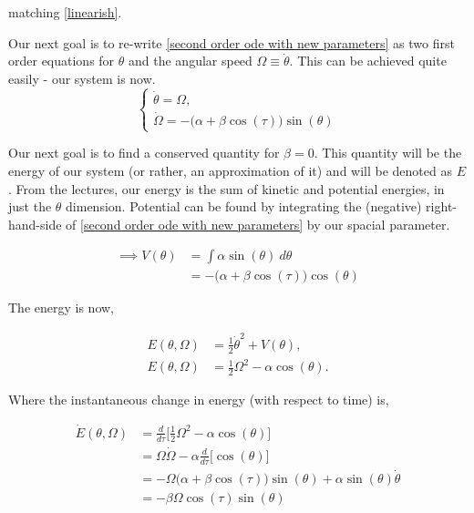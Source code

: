 \documentclass[12pt]{article}
\begin{document}
\begin{enumerate}[]
\begin{solution}
        matching \ref{linearish}. 

        Our next goal is to re-write \ref{second order ode with new parameters} as two first order equations for $\theta$ and the angular speed $\Omega \equiv \dot{\theta}$. This can be achieved quite easily - our system is now. 
        \begin{equation}
        \begin{cases}
            \dot{\theta} = \Omega, \\
            \dot{\Omega} = -\big(\alpha + \beta \cos(\tau)\big)\sin(\theta) \label{Nonlinear system}
        \end{cases}    
        \end{equation}

        Our next goal is to find a conserved quantity for $\beta = 0$. This quantity will be the energy of our system (or rather, an approximation of it) and will be denoted as $E$. From the lectures, our energy is the sum of kinetic and potential energies, in just the $\theta$ dimension. Potential can be found by integrating the (negative) right-hand-side of \ref{second order ode with new parameters} by our spacial parameter. 

        \begin{align}
            \implies V(\theta) &= \int \alpha\sin(\theta) \ d\theta \nonumber\\
            &= -\big(\alpha + \beta\cos(\tau))\cos(\theta)
        \end{align}

        The energy is now,

        \begin{align}
            E(\theta, \Omega) &= \frac{1}{2} \dot{\theta}^2 + V(\theta),    \nonumber   \\
            E(\theta, \Omega) &= \frac{1}{2} \Omega^2 -\alpha\cos(\theta).
        \end{align}

        Where the instantaneous change in energy (with respect to time) is,

        \begin{align}
            \dot{E}(\theta, \Omega) &=  \frac{d}{d\tau}\bigg[ \frac{1}{2}\Omega^2 - \alpha\cos(\theta) \bigg]  \nonumber\\
            &= \Omega\dot{\Omega} - \alpha\frac{d}{d\tau}\bigg[ \cos(\theta) \bigg] \nonumber\\
            &= -\Omega\big(\alpha + \beta \cos(\tau)\big)\sin(\theta) + \alpha\sin(\theta)\dot{\theta}\nonumber\\
            &= -\beta\Omega\cos(\tau)\sin(\theta) \label{Edot}
        \end{align}
        \end{solution}


\end{enumerate}
\end{document}
